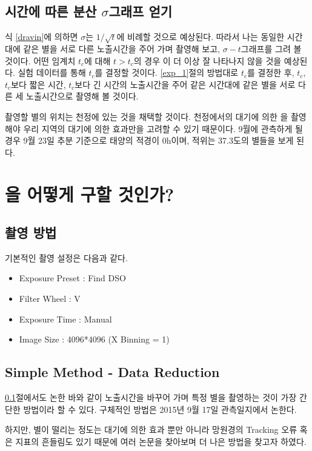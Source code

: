 \documentclass[11pt]{article}
\begin{document}
\subsection{시간에 따른 \scin 분산 $\sigma$그래프 얻기} \label{sigma-t}

식 \ref{dravin}에 의하면 $\sigma$는 $1/\sqrt{t}$에 비례할 것으로 예상된다. 따라서 나는 동일한 시간대에 같은 별을 서로 다른 노출시간을 주어 가며 촬영해 보고, $\sigma - t$그래프를 그려 볼 것이다.
어떤 임계치 $t_c$에 대해 $t>t_c$의 경우 \scin 이 더 이상 잘 나타나지 않을 것을 예상된다. 실험 데이터를 통해 $t_c$를 결정할 것이다.
\ref{exp_1}절의 방법대로 $t_c$를 결정한 후, $t_c$, $t_c$보다 짧은 시간, $t_c$보다 긴 시간의 노출시간을 주어 같은 시간대에 같은 별을 서로 다른 세 노출시간으로 촬영해 볼 것이다.

촬영할 별의 위치는 천정에 있는 것을 채택할 것이다. 천정에서의 대기에 의한 \scin 을 촬영해야 우리 지역의 대기에 의한 효과만을 고려할 수 있기 때문이다.
9월에 관측하게 될 경우 9월 23일 추분 기준으로 태양의 적경이 0h이며, 적위는 37.3도의 별들을 보게 된다.

\section{\scin 을 어떻게 구할 것인가?}

\subsection{촬영 방법}
기본적인 촬영 설정은 다음과 같다.
\begin{itemize}
	\item Exposure Preset : Find DSO 
	\item Filter Wheel : V
	\item Exposure Time : Manual
	\item Image Size : 4096*4096 (X Binning = 1)
\end{itemize}

\subsection{Simple Method - Data Reduction} \label{simple_reduction}

\ref{sigma-t}절에서도 논한 바와 같이 노출시간을 바꾸어 가며 특정 별을 촬영하는 것이 가장 간단한 방법이라 할 수 있다. 구체적인 방법은 2015년 9월 17일 관측일지에서 논한다.

하지만, 별이 떨리는 정도는 대기에 의한 효과 뿐만 아니라 망원경의 Tracking 오류 혹은 지표의 흔들림도 있기 때문에 여러 논문을 찾아보며 더 나은 방법을 찾고자 하였다.
\end{document}
